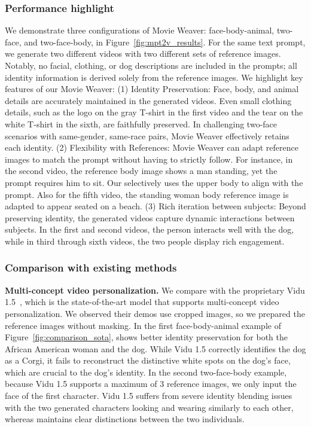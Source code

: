\subsubsection{Performance highlight}
We demonstrate three configurations of Movie Weaver: face-body-animal, two-face, and two-face-body, in Figure~\ref{fig:mpt2v_results}. 
For the same text prompt, we generate two different videos with two different sets of reference images. 
Notably, no facial, clothing, or dog descriptions are included in the prompts; all identity information is derived solely from the reference images. 
We highlight key features of our Movie Weaver: 
(1) Identity Preservation: Face, body, and animal details are accurately maintained in the generated videos.
Even small clothing details, such as the logo on the gray T-shirt in the first video and the tear on the white T-shirt in the sixth, are faithfully preserved.
In challenging two-face scenarios with same-gender, same-race pairs, Movie Weaver effectively retains each identity.
(2) Flexibility with References: Movie Weaver can adapt reference images to match the prompt without having to strictly follow. 
For instance, in the second video, the reference body image shows a man standing, yet the prompt requires him to sit. 
Our \workname selectively uses the upper body to align with the prompt.
Also for the fifth video, the standing woman body reference image is adapted to appear seated on a beach.
(3) Rich iteration between subjects: Beyond preserving identity, the generated videos capture dynamic interactions between subjects. In the first and second videos, the person interacts well with the dog, while in third through sixth videos, the two people display rich engagement.

\subsubsection{Comparison with existing methods}


\textbf{Multi-concept video personalization.} We compare \workname with the proprietary Vidu 1.5~\cite{vidustudio}, which is the state-of-the-art model that supports multi-concept video personalization. 
We observed their demos use cropped images, so we prepared the reference images without masking.
In the first face-body-animal example of Figure~\ref{fig:comparison_sota}, \workname shows better identity preservation for both the African American woman and the dog. 
While Vidu 1.5 correctly identifies the dog as a Corgi, it fails to reconstruct the distinctive white spots on the dog's face, which are crucial to the dog's identity.
In the second two-face-body example, because Vidu 1.5 supports a maximum of 3 reference images, we only input the face of the first character. 
Vidu 1.5 suffers from severe identity blending issues with the two generated characters looking and wearing similarly to each other, whereas \workname maintains clear distinctions between the two individuals.


